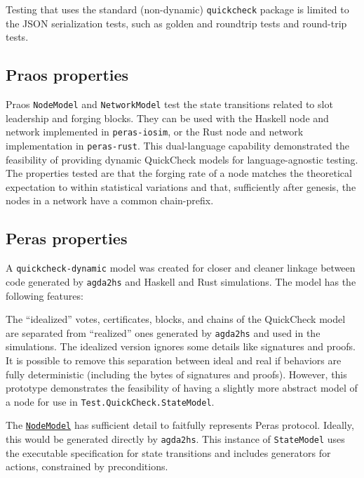 \documentclass[10pt]{article}
\begin{document}
Testing that uses the standard (non-dynamic) \texttt{quickcheck} package
is limited to the JSON serialization tests, such as golden and roundtrip
tests and round-trip tests.

\subsection{Praos properties}\label{praos-properties}

Praos \texttt{NodeModel} and \texttt{NetworkModel} test the state
transitions related to slot leadership and forging blocks. They can be
used with the Haskell node and network implemented in
\texttt{peras-iosim}, or the Rust node and network implementation in
\texttt{peras-rust}. This dual-language capability demonstrated the
feasibility of providing dynamic QuickCheck models for language-agnostic
testing. The properties tested are that the forging rate of a node
matches the theoretical expectation to within statistical variations and
that, sufficiently after genesis, the nodes in a network have a common
chain-prefix.

\subsection{Peras properties}\label{peras-properties}

A \texttt{quickcheck-dynamic} model was created for closer and cleaner
linkage between code generated by \texttt{agda2hs} and Haskell and Rust
simulations. The model has the following features:

The ``idealized'' votes, certificates, blocks, and chains of the
QuickCheck model are separated from ``realized'' ones generated by
\texttt{agda2hs} and used in the simulations. The idealized version
ignores some details like signatures and proofs. It is possible to
remove this separation between ideal and real if behaviors are fully
deterministic (including the bytes of signatures and proofs). However,
this prototype demonstrates the feasibility of having a slightly more
abstract model of a node for use in \texttt{Test.QuickCheck.StateModel}.

The
\href{https://github.com/input-output-hk/peras-design/blob/4bc364f52dd33665cbb13d03d7ca16efea98f4ee/peras-quickcheck/src/Peras/OptimalModel.hs\#L1}{\color{blue}\texttt{\texttt{NodeModel}}}
has sufficient detail to faitfully represents Peras protocol. Ideally,
this would be generated directly by \texttt{agda2hs}. This instance of
\texttt{StateModel} uses the executable specification for state
transitions and includes generators for actions, constrained by
preconditions.
\end{document}
